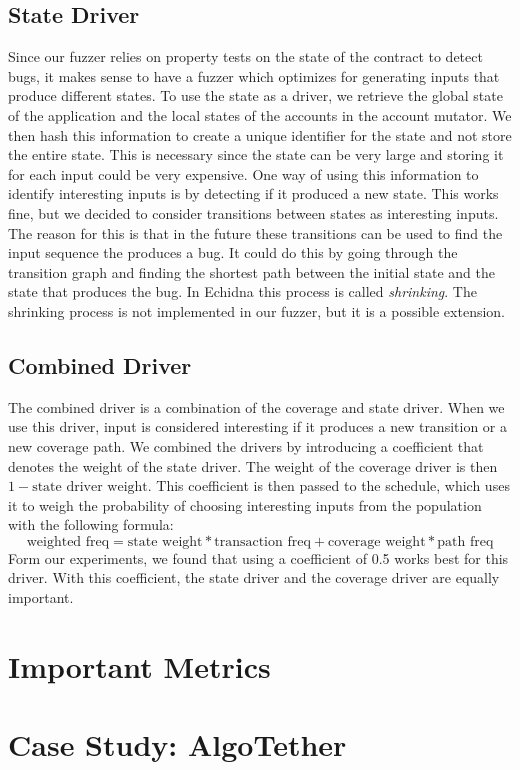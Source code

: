\subsection*{State Driver}
Since our fuzzer relies on property tests on the state of the contract to detect bugs, it makes sense to have a fuzzer which optimizes for generating inputs that produce different states.
To use the state as a driver, we retrieve the global state of the application and the local states of the accounts in the account mutator.
We then hash this information to create a unique identifier for the state and not store the entire state.
This is necessary since the state can be very large and storing it for each input could be very expensive.
One way of using this information to identify interesting inputs is by detecting if it produced a new state.
This works fine, but we decided to consider transitions between states as interesting inputs.
The reason for this is that in the future these transitions can be used to find the input sequence the produces a bug.
It could do this by going through the transition graph and finding the shortest path between the initial state and the state that produces the bug.
In Echidna this process is called \textit{shrinking}.
The shrinking process is not implemented in our fuzzer, but it is a possible extension.

\subsection*{Combined Driver}
The combined driver is a combination of the coverage and state driver.
When we use this driver, input is considered interesting if it produces a new transition or a new coverage path.
We combined the drivers by introducing a coefficient that denotes the weight of the state driver.
The weight of the coverage driver is then $1 - \text{state driver weight}$.
This coefficient is then passed to the schedule, which uses it to weigh the probability of choosing interesting inputs from the population with the following formula:
\[\text{weighted freq} = \text{state weight} * \text{transaction freq} + \text{coverage weight} * \text{path freq}\]
Form our experiments, we found that using a coefficient of 0.5 works best for this driver.
With this coefficient, the state driver and the coverage driver are equally important.

\section{Important Metrics}

\section{Case Study: AlgoTether}
